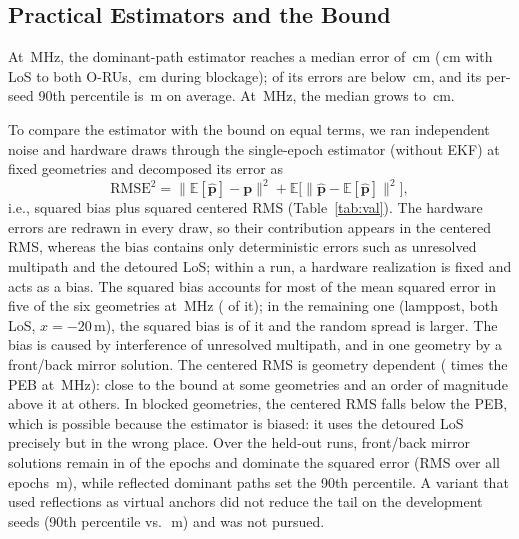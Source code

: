 \documentclass[conference]{IEEEtran}
\begin{document}
\subsection{Practical Estimators and the Bound}
At \pBwC\,MHz, the dominant-path estimator reaches a median error of
\pEstMedFourHundred\,cm (\pEstLosFourHundred\,cm with LoS to both O-RUs,
\pEstBlkFourHundred\,cm during blockage); \pEstDecFourHundred{} of its
errors are below \pDecThr\,cm, and its per-seed 90th percentile is
\pEstPninetyFourHundred\,m on average. At \pBwA\,MHz, the
median grows to \pEstMedHundred\,cm.

To compare the estimator with the bound on equal terms, we ran
\pValNumDraws{} independent noise and hardware draws through the
single-epoch estimator (without EKF) at \pValNumGeom{} fixed geometries
and decomposed its error as
\begin{equation}
\mathrm{RMSE}^2=\|\mathbb E[\hat{\mathbf p}]-\mathbf p\|^2
+\mathbb E\bigl[\|\hat{\mathbf p}-\mathbb E[\hat{\mathbf p}]\|^2\bigr],
\label{eq:decomp}
\end{equation}
i.e., squared bias plus squared centered RMS (Table~\ref{tab:val}). The
hardware errors are redrawn in every draw, so their contribution appears
in the centered RMS, whereas the bias contains only deterministic errors
such as unresolved multipath and the detoured LoS; within a run, a
hardware realization is fixed and acts as a bias. The squared bias accounts for most of the mean squared error in five of the
six geometries at \pBwC\,MHz (\pValBiasMseFour{} of it); in the
remaining one (lamppost, both LoS, $x=-20$\,m), the squared bias is
\pValBiasMseFourOther{} of it and the random spread is larger. The bias is caused by interference of unresolved multipath, and
in one geometry by a front/back mirror solution. The centered RMS is
geometry dependent (\pValCenToPebFour{} times the PEB at
\pBwC\,MHz): close to the bound at some geometries and an order of
magnitude above it at others. In blocked geometries, the centered RMS
falls below the PEB, which is possible because the estimator is biased: it uses the
detoured LoS precisely but in the wrong place. Over the held-out runs, front/back
mirror solutions remain in \pMirrorShareEpochs{} of the epochs and
dominate the squared error (RMS over all epochs \pMirrorARmse\,m), while reflected
dominant paths set the 90th percentile. A variant that used reflections
as virtual anchors did not reduce the tail on the development seeds
(90th percentile \pDevBPninety{} vs.\ \pDevAPninety\,m) and was not
pursued.
\end{document}
